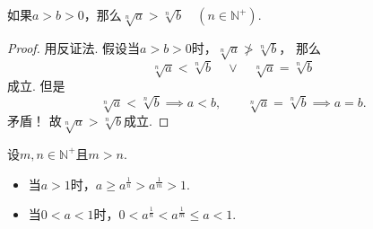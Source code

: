 \begin{theorem}
如果\(a>b>0\)，那么\(\sqrt[n]{a} > \sqrt[n]{b} \quad (n\in\mathbb{N}^+)\).
\begin{proof}
用反证法.
假设当\(a>b>0\)时，\(\sqrt[n]{a} \ngtr \sqrt[n]{b}\)，
那么\[
	\sqrt[n]{a} < \sqrt[n]{b}
	\quad\lor\quad
	\sqrt[n]{a} = \sqrt[n]{b}
\]成立.
但是\[
	\sqrt[n]{a} < \sqrt[n]{b} \implies a<b,
	\qquad
	\sqrt[n]{a} = \sqrt[n]{b} \implies a=b.
\]矛盾！
故\(\sqrt[n]{a}>\sqrt[n]{b}\)成立.
\end{proof}
\end{theorem}

\begin{theorem}
设\(m,n\in\mathbb{N}^+\)且\(m>n\).
\begin{itemize}
	\item 当\(a>1\)时，\(a \geq a^{\frac1n} > a^{\frac1m} > 1\).
	\item 当\(0<a<1\)时，\(0 < a^{\frac1n} < a^{\frac1m} \leq a < 1\).
\end{itemize}
\end{theorem}

